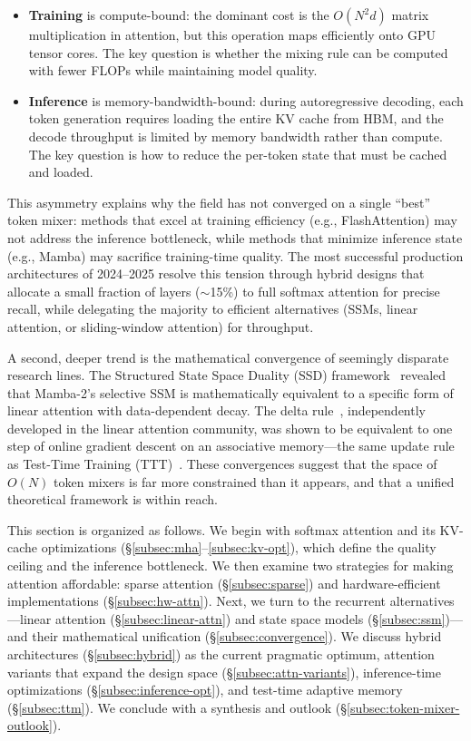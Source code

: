 \begin{itemize}[nosep,leftmargin=*]
\item \textbf{Training} is compute-bound: the dominant cost is the $O(N^2 d)$ matrix multiplication in attention, but this operation maps efficiently onto GPU tensor cores. The key question is whether the mixing rule can be computed with fewer FLOPs while maintaining model quality.
\item \textbf{Inference} is memory-bandwidth-bound: during autoregressive decoding, each token generation requires loading the entire KV cache from HBM, and the decode throughput is limited by memory bandwidth rather than compute. The key question is how to reduce the per-token state that must be cached and loaded.
\end{itemize}

This asymmetry explains why the field has not converged on a single ``best'' token mixer: methods that excel at training efficiency (e.g., FlashAttention) may not address the inference bottleneck, while methods that minimize inference state (e.g., Mamba) may sacrifice training-time quality.
The most successful production architectures of 2024--2025 resolve this tension through hybrid designs that allocate a small fraction of layers (${\sim}$15\%) to full softmax attention for precise recall, while delegating the majority to efficient alternatives (SSMs, linear attention, or sliding-window attention) for throughput.

A second, deeper trend is the mathematical convergence of seemingly disparate research lines.
The Structured State Space Duality (SSD) framework~\cite{dao2024transformers} revealed that Mamba-2's selective SSM is mathematically equivalent to a specific form of linear attention with data-dependent decay.
The delta rule~\cite{yang2024deltanet}, independently developed in the linear attention community, was shown to be equivalent to one step of online gradient descent on an associative memory---the same update rule as Test-Time Training (TTT)~\cite{sun2024learning}.
These convergences suggest that the space of $O(N)$ token mixers is far more constrained than it appears, and that a unified theoretical framework is within reach.

This section is organized as follows.
We begin with softmax attention and its KV-cache optimizations (\S\ref{subsec:mha}--\ref{subsec:kv-opt}), which define the quality ceiling and the inference bottleneck.
We then examine two strategies for making attention affordable: sparse attention (\S\ref{subsec:sparse}) and hardware-efficient implementations (\S\ref{subsec:hw-attn}).
Next, we turn to the recurrent alternatives---linear attention (\S\ref{subsec:linear-attn}) and state space models (\S\ref{subsec:ssm})---and their mathematical unification (\S\ref{subsec:convergence}).
We discuss hybrid architectures (\S\ref{subsec:hybrid}) as the current pragmatic optimum, attention variants that expand the design space (\S\ref{subsec:attn-variants}), inference-time optimizations (\S\ref{subsec:inference-opt}), and test-time adaptive memory (\S\ref{subsec:ttm}).
We conclude with a synthesis and outlook (\S\ref{subsec:token-mixer-outlook}).



